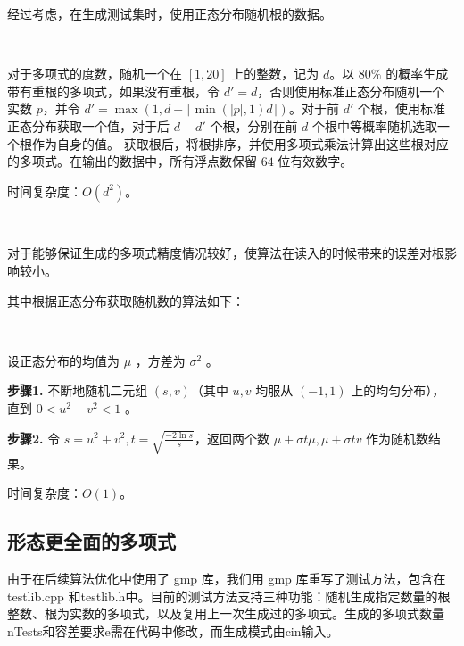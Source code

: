 经过考虑，在生成测试集时，使用正态分布随机根的数据。

\begin{algorithm}[生成测试多项式]~

	对于多项式的度数，随机一个在 $[1,20]$ 上的整数，记为 $d$。以 $80\%$ 的概率生成带有重根的多项式，如果没有重根，令 $d'=d$，否则使用标准正态分布随机一个实数 $p$，并令 $d'=\max(1,d-\lceil \min(|p|,1)d\rceil)$。对于前 $d'$ 个根，使用标准正态分布获取一个值，对于后 $d-d'$ 个根，分别在前 $d$ 个根中等概率随机选取一个根作为自身的值。
	获取根后，将根排序，并使用多项式乘法计算出这些根对应的多项式。在输出的数据中，所有浮点数保留 $64$ 位有效数字。
	
	时间复杂度：$O(d^2)$。
	
	
\end{algorithm}

\begin{conjecture}[]~
	
	对于能够保证生成的多项式精度情况较好，使算法在读入的时候带来的误差对根影响较小。
	
\end{conjecture}

其中根据正态分布获取随机数的算法如下：

\begin{algorithm}~
	
	设正态分布的均值为 $\mu$ ，方差为 $\sigma ^ 2$ 。
	
	\textbf{步骤1.} 不断地随机二元组 $(s, v)$（其中 $u, v$ 均服从 $(-1, 1)$ 上的均匀分布），直到 $0 < u^2 + v^2 < 1$ 。
	
	\textbf{步骤2.} 令 $s = u^2 + v^2, t = \sqrt{\frac{-2\ln s}{s}}$，返回两个数 $\mu + \sigma t \mu, \mu + \sigma tv$ 作为随机数结果。
	
	时间复杂度：$O(1)$。
	
\end{algorithm}

\subsection{形态更全面的多项式}

	由于在后续算法优化中使用了 gmp 库，我们用 gmp 库重写了测试方法，包含在testlib.cpp 和testlib.h中。目前的测试方法支持三种功能：随机生成指定数量的根整数、根为实数的多项式，以及复用上一次生成过的多项式。生成的多项式数量nTests和容差要求e需在代码中修改，而生成模式由cin输入。 
	
